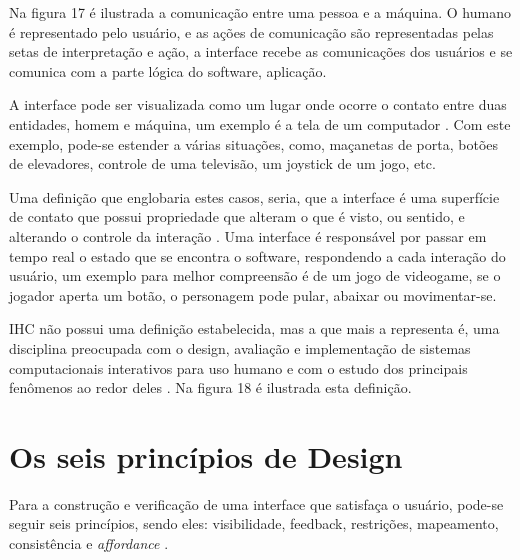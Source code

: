 \documentclass[12pt,oneside,a4paper,chapter=TITLE,section=TITLE,sumario=tradicional]{abntex2}
\begin{document}
Na figura 17 é ilustrada a comunicação entre uma pessoa e a máquina. O humano é representado pelo usuário, e as ações de comunicação são representadas pelas setas de interpretação e ação, a interface recebe as comunicações dos usuários e se comunica com a parte lógica do software, aplicação.

\begin{figure}[htb]
\end{figure}

A interface pode ser visualizada como um lugar onde ocorre o contato entre duas entidades, homem e máquina, um exemplo é a tela de um computador \cite{rocha2003}. Com este exemplo, pode-se estender a várias situações, como, maçanetas de porta, botões de elevadores, controle de uma televisão, um joystick de um jogo, etc.

Uma definição que englobaria estes casos, seria, que a interface é uma superfície de contato que possui propriedade que alteram o que é visto, ou sentido, e alterando o controle da interação \cite{laurel1993}. Uma interface é responsável por passar em tempo real o estado que se encontra o software, respondendo a cada interação do usuário, um exemplo para melhor compreensão é de um jogo de videogame, se o jogador aperta um botão, o personagem pode pular, abaixar ou movimentar-se.

IHC não possui uma definição estabelecida, mas a que mais a representa é, uma disciplina preocupada com o design, avaliação e implementação de sistemas computacionais interativos para uso humano e com o estudo dos principais fenômenos ao redor deles \cite{rocha2003}. Na figura 18 é ilustrada esta definição.

\begin{figure}[htb]
\end{figure}

\section{Os seis princípios de Design}
\label{sec:seisprincipios}

Para a construção e verificação de uma interface que satisfaça o usuário, pode-se seguir seis princípios, sendo eles: visibilidade, feedback, restrições, mapeamento, consistência e \textit{affordance} \cite{norman2002}.
\end{document}
